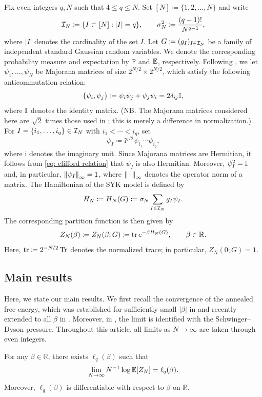 \documentclass[../CLT_SYK.tex]{subfiles}
\begin{document}
Fix even integers $q,N$ such that $4\leq q\leq N$. Set $[N] \coloneqq \{1,2,\ldots,N\}$ and write
\[
  \mathcal I_N \coloneqq \{I\subset[N]:|I|=q\},\qquad
  \sigma_N^2 \coloneqq \frac{(q-1)!}{N^{q-1}},
\]
where $|I|$ denotes the cardinality of the set $I$.
Let $G \coloneqq (g_I)_{I\in\mathcal I_N}$ be a family of independent standard Gaussian random
variables. We denote the corresponding probability measure and expectation by $\mathbb P$ and $\mathbb E$, respectively. Following \cite[Section~2]{GPSZ2026}, we let $\psi_1,\ldots,\psi_N$ be Majorana matrices of size $2^{N/2} \times 2^{N/2}$, which satisfy the following anticommutation relation:
\begin{equation}
  \label{eq: clifford relation}
  \{\psi_i,\psi_j\} \coloneqq \psi_i \psi_j + \psi_j \psi_i =2\delta_{ij}\mathbb I,
\end{equation}
where $\mathbb I$ denotes the identity matrix.
(NB. The Majorana matrices considered here are $\sqrt{2}$ times those used in \cite{GPSZ2026,He2026}; this is merely a difference in normalization.)
For
$I = \{i_1, \ldots, i_q\} \in \mathcal I_N$ with $i_1 < \cdots < i_q$, set
\[
  \psi_I \coloneqq \mathrm i^{q/2}\psi_{i_1}\cdots\psi_{i_q},
\]
where $\mathrm i$ denotes the imaginary unit. Since Majorana matrices are Hermitian, it follows from \eqref{eq: clifford relation} that 
$\psi_I$ is also Hermitian. Moreover, $\psi_I^2=\mathbb I$ and, in particular, $\left\lVert \psi_I\right\rVert_\infty=1$, where $\left\lVert \,\cdot\,\right\rVert_\infty$ denotes the operator norm of a matrix.  
The Hamiltonian of the SYK model is defined by 
\[
  H_N \coloneqq H_N(G) \coloneqq \sigma_N\sum_{I\in\mathcal I_N}g_I\psi_I.
\]
The corresponding partition function is then given by
\[
  Z_N(\beta) \coloneqq Z_N(\beta;G) \coloneqq \operatorname{tr} e^{-\beta H_N(G)},\qquad \beta \in \mathbb R.
\]
Here, $\operatorname{tr} \coloneqq 2^{-N/2}\operatorname{Tr}$ denotes the normalized trace; in
particular, $Z_N(0;G)=1$.  

\subsection{Main results}
Here, we state our main results. 
We first recall the convergence of the annealed free energy, which was established for sufficiently small $|\beta|$ in \cite{GPSZ2026} and recently extended to all $\beta$ in \cite{He2026}. Moreover, in \cite{He2026}, the limit is identified with the Schwinger--Dyson pressure. Throughout this article, all limits as $N \to \infty$ are taken through even integers.
\begin{theorem}\label{thm: input}
For any $\beta\in \mathbb R$, there exists  $\ell_q(\beta)$ such that
\begin{align*}
    \lim_{N\to \infty} N^{-1} \log \mathbb E[Z_N] =\ell_q(\beta).
\end{align*}
Moreover, $\ell_q(\beta)$ is differentiable with respect to $\beta$ on $\mathbb R$.
\end{theorem}
\end{document}
